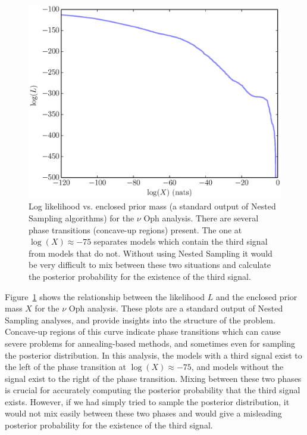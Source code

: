 \documentclass[useAMS,usenatbib]{mn2e}
\begin{document}
\begin{figure}
\includegraphics[scale=0.45]{Figures/logl0.eps}
\caption{Log likelihood vs. enclosed prior mass (a standard output of Nested
Sampling algorithms) for the $\nu$ Oph analysis.
There are several phase transitions (concave-up regions) present. The one at
$\log(X) \approx -75$ separates models which contain the third signal from
models that do not. Without using Nested Sampling it would be very difficult
to mix between these two situations and calculate the posterior probability
for the existence of the third signal.
\label{fig:logl0}}
\end{figure}

Figure~\ref{fig:logl0} shows the relationship between the likelihood $L$
and the enclosed prior mass $X$ for the $\nu$ Oph analysis. These plots are
a standard output of Nested Sampling analyses, and provide
insights into the structure of the problem. Concave-up regions of this curve
indicate phase transitions which can cause severe problems for annealing-based
methods, and sometimes even for sampling the posterior distribution. In this
analysis, the models with a third signal exist to the left of the phase
transition at $\log(X) \approx -75$, and models without the signal exist to the
right of the phase transition. Mixing between these two phases is crucial for
accurately computing the posterior probability that the third signal exists.
However, if we had simply tried to sample the posterior distribution, it would
not mix easily between these two phases and would give a misleading posterior
probability for the existence of the third signal.
\end{document}
